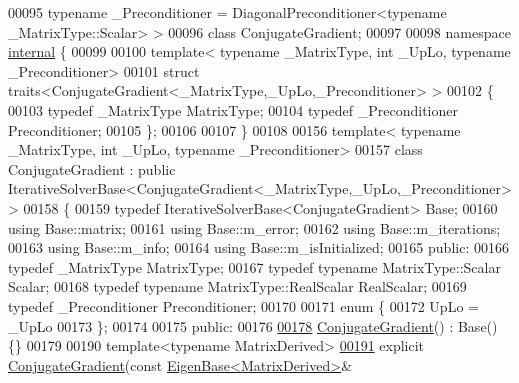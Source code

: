 \begin{DoxyCode}
00095           \textcolor{keyword}{typename} \_Preconditioner = DiagonalPreconditioner<typename \_MatrixType::Scalar> >
00096 \textcolor{keyword}{class }ConjugateGradient;
00097 
00098 \textcolor{keyword}{namespace }\hyperlink{namespaceinternal}{internal} \{
00099 
00100 \textcolor{keyword}{template}< \textcolor{keyword}{typename} \_MatrixType, \textcolor{keywordtype}{int} \_UpLo, \textcolor{keyword}{typename} \_Preconditioner>
00101 \textcolor{keyword}{struct }traits<ConjugateGradient<\_MatrixType,\_UpLo,\_Preconditioner> >
00102 \{
00103   \textcolor{keyword}{typedef} \_MatrixType MatrixType;
00104   \textcolor{keyword}{typedef} \_Preconditioner Preconditioner;
00105 \};
00106 
00107 \}
00108 
00156 \textcolor{keyword}{template}< \textcolor{keyword}{typename} \_MatrixType, \textcolor{keywordtype}{int} \_UpLo, \textcolor{keyword}{typename} \_Preconditioner>
00157 \textcolor{keyword}{class }ConjugateGradient : \textcolor{keyword}{public} IterativeSolverBase<ConjugateGradient<\_MatrixType,\_UpLo,\_Preconditioner> >
00158 \{
00159   \textcolor{keyword}{typedef} IterativeSolverBase<ConjugateGradient> Base;
00160   \textcolor{keyword}{using} Base::matrix;
00161   \textcolor{keyword}{using} Base::m\_error;
00162   \textcolor{keyword}{using} Base::m\_iterations;
00163   \textcolor{keyword}{using} Base::m\_info;
00164   \textcolor{keyword}{using} Base::m\_isInitialized;
00165 \textcolor{keyword}{public}:
00166   \textcolor{keyword}{typedef} \_MatrixType MatrixType;
00167   \textcolor{keyword}{typedef} \textcolor{keyword}{typename} MatrixType::Scalar Scalar;
00168   \textcolor{keyword}{typedef} \textcolor{keyword}{typename} MatrixType::RealScalar RealScalar;
00169   \textcolor{keyword}{typedef} \_Preconditioner Preconditioner;
00170 
00171   \textcolor{keyword}{enum} \{
00172     UpLo = \_UpLo
00173   \};
00174 
00175 \textcolor{keyword}{public}:
00176 
\hyperlink{group___iterative_linear_solvers___module_a92a9656ca9fa4da240194f89229255eb}{00178}   \hyperlink{group___iterative_linear_solvers___module_a92a9656ca9fa4da240194f89229255eb}{ConjugateGradient}() : Base() \{\}
00179 
00190   \textcolor{keyword}{template}<\textcolor{keyword}{typename} MatrixDerived>
\hyperlink{group___iterative_linear_solvers___module_ac10f778fcd137eca1f6057c8ddd3d644}{00191}   \textcolor{keyword}{explicit} \hyperlink{group___iterative_linear_solvers___module_ac10f778fcd137eca1f6057c8ddd3d644}{ConjugateGradient}(\textcolor{keyword}{const} \hyperlink{group___core___module_struct_eigen_1_1_eigen_base}{EigenBase<MatrixDerived>}& 

\end{DoxyCode}
